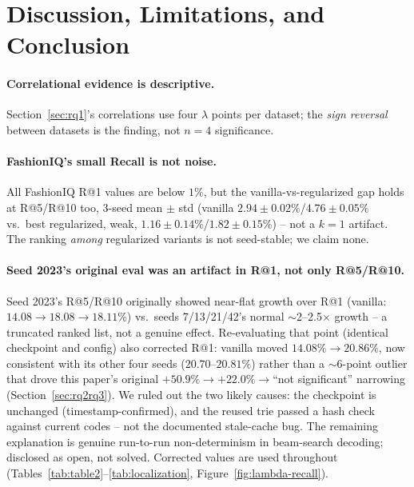 \section{Discussion, Limitations, and Conclusion}
\label{sec:limitations}

\paragraph{Correlational evidence is descriptive.} Section~\ref{sec:rq1}'s correlations use four $\lambda$ points per dataset; the \emph{sign reversal} between datasets is the finding, not $n=4$ significance.

\paragraph{FashionIQ's small Recall is not noise.} All FashionIQ R@1 values are below $1\%$, but the vanilla-vs-regularized gap holds at R@5/R@10 too, 3-seed mean $\pm$ std (vanilla $2.94\pm0.02\%$/$4.76\pm0.05\%$ vs.\ best regularized, weak, $1.16\pm0.14\%$/$1.82\pm0.15\%$) -- not a $k{=}1$ artifact. The ranking \emph{among} regularized variants is not seed-stable; we claim none.

\paragraph{Seed 2023's original eval was an artifact in R@1, not only R@5/R@10.} Seed 2023's R@5/R@10 originally showed near-flat growth over R@1 (vanilla: $14.08\to18.08\to18.11\%$) vs.\ seeds 7/13/21/42's normal $\sim$2--2.5$\times$ growth -- a truncated ranked list, not a genuine effect. Re-evaluating that point (identical checkpoint and config) also corrected R@1: vanilla moved $14.08\%\to20.86\%$, now consistent with its other four seeds ($20.70$--$20.81\%$) rather than a $\sim$6-point outlier that drove this paper's original $+50.9\%\to+22.0\%\to$``not significant'' narrowing (Section~\ref{sec:rq2rq3}). We ruled out the two likely causes: the checkpoint is unchanged (timestamp-confirmed), and the reused trie passed a hash check against current codes -- not the documented stale-cache bug. The remaining explanation is genuine run-to-run non-determinism in beam-search decoding; disclosed as open, not solved. Corrected values are used throughout (Tables~\ref{tab:table2}--\ref{tab:localization}, Figure~\ref{fig:lambda-recall}).

